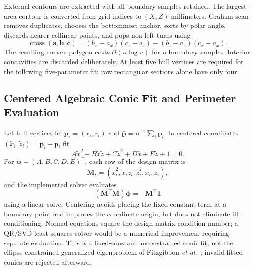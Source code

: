 External contours are extracted with all boundary samples retained. The largest-area contour is converted from grid indices to $(X,Z)$ millimeters. Graham scan removes duplicates, chooses the bottommost anchor, sorts by polar angle, discards nearer collinear points, and pops non-left turns using
\begin{equation}
\operatorname{cross}(\mathbf a,\mathbf b,\mathbf c)
=(b_x-a_x)(c_z-a_z)-(b_z-a_z)(c_x-a_x).
\end{equation}
The resulting convex polygon costs $\mathcal O(n\log n)$ for $n$ boundary samples. Interior concavities are discarded deliberately. At least five hull vertices are required for the following five-parameter fit; raw rectangular sections alone have only four.

\subsection{Centered Algebraic Conic Fit and Perimeter Evaluation}
Let hull vertices be $\mathbf p_i=(x_i,z_i)$ and $\bar{\mathbf p}=n^{-1}\sum_i\mathbf p_i$. In centered coordinates $(\tilde x_i,\tilde z_i)=\mathbf p_i-\bar{\mathbf p}$, fit
\begin{equation}
A\tilde x^2+B\tilde x\tilde z+C\tilde z^2+D\tilde x+E\tilde z+1=0.
\end{equation}
For $\boldsymbol\phi=(A,B,C,D,E)^\top$, each row of the design matrix is
\begin{equation}
\mathbf M_i=(\tilde x_i^2,\tilde x_i\tilde z_i,\tilde z_i^2,\tilde x_i,\tilde z_i),
\end{equation}
and the implemented solver evaluates
\begin{equation}
(\mathbf M^\top\mathbf M)\boldsymbol\phi=-\mathbf M^\top\mathbf 1
\label{eq:conic_normal_equations}
\end{equation}
using a linear solve. Centering avoids placing the fixed constant term at a boundary point and improves the coordinate origin, but does not eliminate ill-conditioning. Normal equations square the design matrix condition number; a QR/SVD least-squares solver would be a numerical improvement requiring separate evaluation. This is a fixed-constant unconstrained conic fit, not the ellipse-constrained generalized eigenproblem of Fitzgibbon \emph{et al.}~\cite{fitzgibbon1999direct}; invalid fitted conics are rejected afterward.

